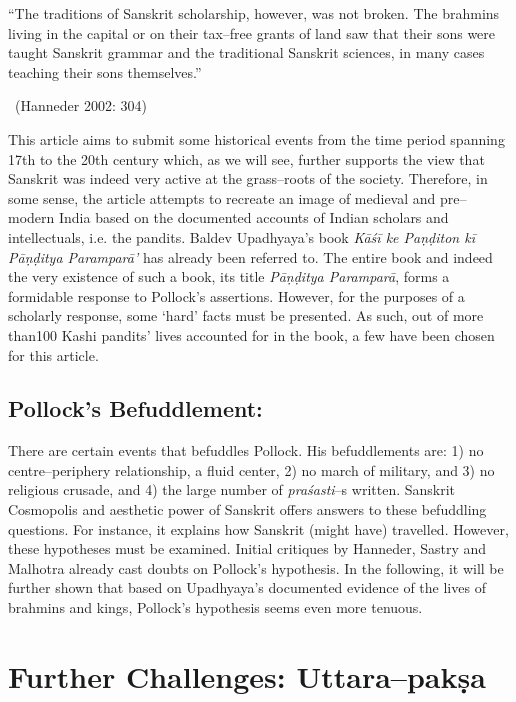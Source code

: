 \begin{myquote}
“The traditions of Sanskrit scholarship, however, was not broken. The brahmins living in the capital or on their tax–free grants of land saw that their sons were taught Sanskrit grammar and the traditional Sanskrit sciences, in many cases teaching their sons themselves.” 

~\hfill (Hanneder 2002: 304)
\end{myquote}

This article aims to submit some historical events from the time period spanning 17th to the 20th century which, as we will see, further supports the view that Sanskrit was indeed very active at the grass–roots of the society. Therefore, in some sense, the article attempts to recreate an image of medieval and pre–modern India based on the documented accounts of Indian scholars and intellectuals, i.e. the pandits. Baldev Upadhyaya’s book \textit{Kāśī ke Paṇḍiton kī Pāṇḍitya Paramparā’} has already been referred to. The entire book and indeed the very existence of such a book, its title \textit{Pāṇḍitya Paramparā}, forms a formidable response to Pollock’s assertions. However, for the purposes of a scholarly response, some ‘hard’ facts must be presented. As such, out of more than100 Kashi pandits’ lives accounted for in the book, a few have been chosen for this article.


\subsection*{Pollock’s Befuddlement:}

There are certain events that befuddles Pollock. His befuddlements are: 1) no centre–periphery relationship, a fluid center, 2) no march of military, and 3) no religious crusade, and 4) the large number of \textit{praśasti}–s written. Sanskrit Cosmopolis and aesthetic power of Sanskrit offers answers to these befuddling questions. For instance, it explains how Sanskrit (might have) travelled. However, these hypotheses must be examined. Initial critiques by Hanneder, Sastry and Malhotra already cast doubts on Pollock’s hypothesis. In the following, it will be further shown that based on Upadhyaya’s documented evidence of the lives of brahmins and kings, Pollock’s hypothesis seems even more tenuous.


\section*{Further Challenges: Uttara–pakṣa}

